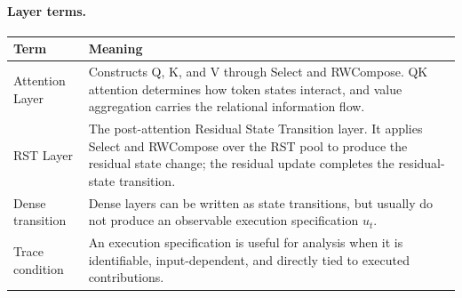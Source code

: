 \documentclass{article}
\begin{document}
\noindent\begin{minipage}{\textwidth}
\paragraph{Layer terms.}
\vspace{-0.35em}
\begin{center}
\small
\setlength{\tabcolsep}{5pt}
\renewcommand{\arraystretch}{1.06}
\begin{tabularx}{\textwidth}{lX}
\toprule
\textbf{Term} & \textbf{Meaning} \\
\midrule
Attention Layer & Constructs Q, K, and V through Select and RWCompose. QK attention determines how token states interact, and value aggregation carries the relational information flow. \\
RST Layer & The post-attention Residual State Transition layer. It applies Select and RWCompose over the RST pool to produce the residual state change; the residual update completes the residual-state transition. \\
Dense transition & Dense layers can be written as state transitions, but usually do not produce an observable execution specification $u_t$. \\
Trace condition & An execution specification is useful for analysis when it is identifiable, input-dependent, and directly tied to executed contributions. \\
\bottomrule
\end{tabularx}
\end{center}
\end{minipage}
\par\medskip
\end{document}

